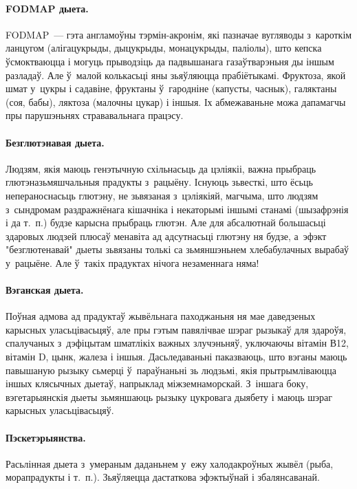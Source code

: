 \paragraph{FODMAP дыета.}
FODMAP~--- гэта англамоўны тэрмін-акронім, які пазначае вугляводы з~кароткім ланцугом (алігацукрыды, дыцукрыды, монацукрыды, паліолы), што кепска ўсмоктваюцца і могуць прыводзіць да падвышанага газаўтварэньня ды іншым разладаў. Але ў~малой колькасьці яны зьяўляюцца прабіётыкамі. Фруктоза, якой шмат у~цукры і садавіне, фруктаны ў~гародніне (капусты, часнык), галяктаны (соя, бабы), ляктоза (малочны цукар) і іншыя. Іх абмежаваньне можа дапамагчы пры парушэньнях стрававальнага працэсу.

\paragraph{Безглютэнавая дыета.}
Людзям, якія маюць генэтычную схільнасьць да цэліякіі, важна прыбраць глютэназьмяшчальныя прадукты з~рацыёну. Існуюць зьвесткі, што ёсьць непераноснасьць глютэну, не зьвязаная з~цэліякіяй, магчыма, што людзям з~сындромам раздражнёнага кішачніка і некаторымі іншымі станамі (шызафрэнія і да т.~п.) будзе карысна прыбраць глютэн. Але для абсалютнай большасьці здаровых людзей плюсаў менавіта ад адсутнасьці глютэну ня будзе, а~эфэкт "безглютенавай" дыеты зьвязаны толькі са зьмяншэньнем хлебабулачных вырабаў у~рацыёне. Але ў~такіх прадуктах нічога незаменнага няма!

\paragraph{Вэганская дыета.}
Поўная адмова ад прадуктаў жывёльнага паходжаньня ня мае даведзеных карысных уласьцівасьцяў, але пры гэтым павялічвае шэраг рызыкаў для здароўя, спалучаных з~дэфіцытам шматлікіх важных злучэньняў, уключаючы вітамін В12, вітамін D, цынк, жалеза і іншыя. Дасьледаваньні паказваюць, што вэганы маюць павышаную рызыку сьмерці ў~параўнаньні зь людзьмі, якія прытрымліваюцца іншых клясычных дыетаў, напрыклад міжземнаморскай. З~іншага боку, вэгетарыянскія дыеты зьмяншаюць рызыку цукровага дыябету і маюць шэраг карысных уласьцівасьцяў.


\paragraph{Пэскетэрыянства.}
Расьлінная дыета з~умераным даданьнем у~ежу халодакроўных жывёл (рыба, морапрадукты і т.~п.). Зьяўляецца дастаткова эфэктыўнай і збалянсаванай.

